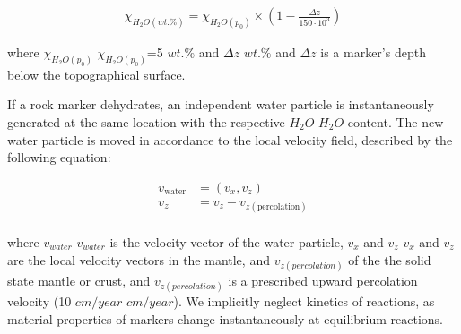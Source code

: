 \documentclass[draft,linenumbers]{agujournal2018} %
\providecommand{\DIFaddtex}[1]{{\protect\color{blue} \sf #1}} %
\providecommand{\DIFdeltex}[1]{{\protect\color{red} \scriptsize #1}} %
\providecommand{\DIFaddbegin}{} %
\providecommand{\DIFaddend}{} %
\providecommand{\DIFdelbegin}{} %
\providecommand{\DIFdelend}{} %
\providecommand{\DIFadd}[1]{\texorpdfstring{\DIFaddtex{#1}}{#1}} %
\providecommand{\DIFdel}[1]{\texorpdfstring{\DIFdeltex{#1}}{}} %
\newcommand{\DIFscaledelfig}{0.3}
\newlength{\DIFdelgraphicswidth} %
\newlength{\DIFdelgraphicsheight} %
\newcommand{\DIFaddincludegraphics}[2][]{{\color{blue}\fbox{\DIFOincludegraphics[#1]{#2}}}} %
\newcommand{\DIFdelincludegraphics}[2][]{%
\sbox{\DIFdelgraphicsbox}{\DIFOincludegraphics[#1]{#2}}%
\settoboxwidth{\DIFdelgraphicswidth}{\DIFdelgraphicsbox} %
\settoboxtotalheight{\DIFdelgraphicsheight}{\DIFdelgraphicsbox} %
\scalebox{\DIFscaledelfig}{%
\parbox[b]{\DIFdelgraphicswidth}{\usebox{\DIFdelgraphicsbox}\\[-\baselineskip] \rule{\DIFdelgraphicswidth}{0em}}\llap{\resizebox{\DIFdelgraphicswidth}{\DIFdelgraphicsheight}{%
\setlength{\unitlength}{\DIFdelgraphicswidth}%
\begin{picture}(1,1)%
\thicklines\linethickness{2pt} %
{\color[rgb]{1,0,0}\put(0,0){\framebox(1,1){}}}%
{\color[rgb]{1,0,0}\put(0,0){\line( 1,1){1}}}%
{\color[rgb]{1,0,0}\put(0,1){\line(1,-1){1}}}%
\end{picture}%
}\hspace*{3pt}}} %
} %
\DeclareRobustCommand{\DIFaddbegin}{\DIFOaddbegin \let\includegraphics\DIFaddincludegraphics} %
\DeclareRobustCommand{\DIFaddend}{\DIFOaddend \let\includegraphics\DIFOincludegraphics} %
\DeclareRobustCommand{\DIFdelbegin}{\DIFOdelbegin \let\includegraphics\DIFdelincludegraphics} %
\DeclareRobustCommand{\DIFdelend}{\DIFOaddend \let\includegraphics\DIFOincludegraphics} %
\begin{document}
\DIFdelbegin %
\DIFdelend \DIFaddbegin \[\begin{aligned}\chi_{H_{2}O(wt.\%)} = \chi_{H_{2}O(p_{0})} \times \left( 1 - \frac{\Delta z}{150 \cdot 10^{3}} \right)\end{aligned}\]\DIFaddend

where \DIFdelbegin \DIFdel{$\chi_{H_2O(p_0)}$}\DIFdelend \DIFaddbegin \DIFadd{\(\chi_{H_{2}O(p_{0})}\)}\DIFaddend =5 \DIFdelbegin \DIFdel{$wt.\%$ and $\Delta z$ }\DIFdelend \DIFaddbegin \DIFadd{\(wt.\%\) and \(\Delta z\) }\DIFaddend is a
marker's depth below the topographical surface.

If a rock marker dehydrates, an independent water particle is
instantaneously generated at the same location with the respective
\DIFdelbegin \DIFdel{$H_2O$ }\DIFdelend \DIFaddbegin \DIFadd{\(H_{2}O\) }\DIFaddend content. The new water particle is moved in accordance to the
local velocity field, described by the following equation:

\DIFdelbegin %
\DIFdelend \DIFaddbegin \[\begin{aligned}
v_{\text{water}} & = (v_{x},v_{z}) \\
v_{z} & = v_{z} - v_{z(\text{percolation})} \\
\end{aligned}\]\DIFaddend

where \DIFdelbegin \DIFdel{$v_{water}$ }\DIFdelend \DIFaddbegin \DIFadd{\(v_{water}\) }\DIFaddend is the velocity vector of the water particle,
\DIFdelbegin \DIFdel{$v_x$ and $v_z$ }\DIFdelend \DIFaddbegin \DIFadd{\(v_{x}\) and \(v_{z}\) }\DIFaddend are the local velocity vectors \DIFdelbegin \DIFdel{in the mantle, and $v_{z(percolation)}$ }\DIFdelend \DIFaddbegin \DIFadd{of the the solid
state mantle or crust, and \(v_{z(percolation)}\) }\DIFaddend is a prescribed upward
percolation velocity (10 \DIFdelbegin \DIFdel{$cm/year$}\DIFdelend \DIFaddbegin \DIFadd{\(cm/year\)}\DIFaddend ). We implicitly neglect kinetics of
reactions, as material properties of markers change instantaneously at
equilibrium reactions.
\end{document}
